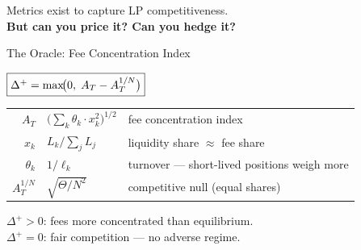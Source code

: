 \documentclass[aspectratio=169]{beamer}
\newcommand{\AT}{A_T}
\newcommand{\ThetaSum}{\Theta}
\newcommand{\PosCount}{N}
\newcommand{\ATnull}{A_T^{1/\PosCount}}
\newcommand{\DeltaPlus}{\Delta^{+}}
\newcommand{\thetapos}{\theta}
\newcommand{\blocklife}{\ell}
\begin{document}
\begin{frame}{}
\vfill
\begin{center}
\Large
Metrics exist to capture LP competitiveness.\\[12pt]
\textbf{\large But can you price it? Can you hedge it?}
\end{center}

\vfill

\begin{flushright}
\footnotesize\itshape
\citet{milionis2024flair}
\end{flushright}
\end{frame}

\begin{frame}{The Oracle: Fee Concentration Index}

\begin{center}
{\Large $\fbox{$\DeltaPlus = \max\!\bigl(0,\; \AT - \ATnull\bigr)$}$}
\end{center}

\bigskip

\renewcommand{\arraystretch}{1.6}
\begin{tabular}{@{}r@{\;=\;}l@{\quad}p{7cm}@{}}
$\AT$ & $\bigl(\sum_k \thetapos_k \cdot x_k^2\bigr)^{1/2}$
  & fee concentration index \\
$x_k$ & $L_k / \sum_j L_j$
  & liquidity share $\approx$ fee share \\
$\thetapos_k$ & $1/\blocklife_k$
  & turnover --- short-lived positions weigh more \\
$\ATnull$ & $\sqrt{\ThetaSum / \PosCount^2}$
  & competitive null (equal shares) \\
\end{tabular}

\bigskip

\begin{center}
$\DeltaPlus > 0$: fees more concentrated than equilibrium.\\[2pt]
$\DeltaPlus = 0$: fair competition --- no adverse regime.
\end{center}

\end{frame}
\end{document}
